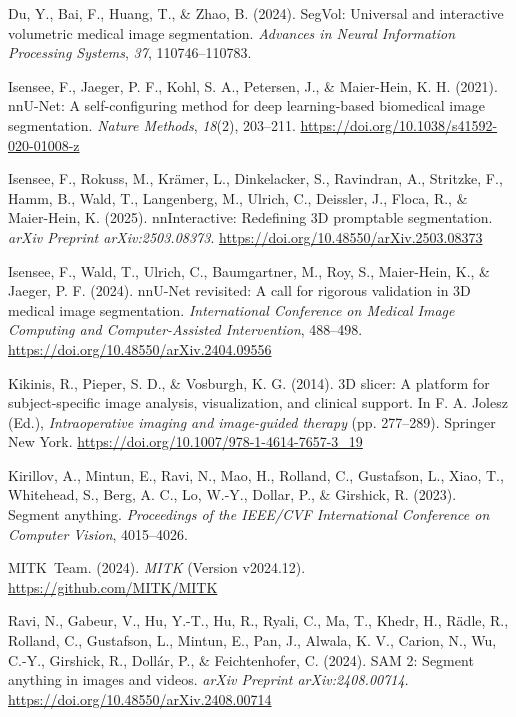 \documentclass[
]{article}
\newlength{\cslhangindent}
\newenvironment{CSLReferences}[2] %
 {\begin{list}{}{%
  \setlength{\itemindent}{0pt}
  \setlength{\leftmargin}{0pt}
  \setlength{\parsep}{0pt}
  \ifodd #1
   \setlength{\leftmargin}{\cslhangindent}
   \setlength{\itemindent}{-1\cslhangindent}
  \fi
  \setlength{\itemsep}{#2\baselineskip}}}
 {\end{list}}
\begin{document}
\label{refs}
\begin{CSLReferences}{1}{0}
Du, Y., Bai, F., Huang, T., \& Zhao, B. (2024). {SegVol}: Universal and
interactive volumetric medical image segmentation. \emph{Advances in
Neural Information Processing Systems}, \emph{37}, 110746--110783.

Isensee, F., Jaeger, P. F., Kohl, S. A., Petersen, J., \& Maier-Hein, K.
H. (2021). {nnU-Net}: A self-configuring method for deep learning-based
biomedical image segmentation. \emph{Nature Methods}, \emph{18}(2),
203--211. \url{https://doi.org/10.1038/s41592-020-01008-z}

Isensee, F., Rokuss, M., Krämer, L., Dinkelacker, S., Ravindran, A.,
Stritzke, F., Hamm, B., Wald, T., Langenberg, M., Ulrich, C., Deissler,
J., Floca, R., \& Maier-Hein, K. (2025). nnInteractive: Redefining 3D
promptable segmentation. \emph{arXiv Preprint arXiv:2503.08373}.
\url{https://doi.org/10.48550/arXiv.2503.08373}

Isensee, F., Wald, T., Ulrich, C., Baumgartner, M., Roy, S., Maier-Hein,
K., \& Jaeger, P. F. (2024). {nnU-Net} revisited: A call for rigorous
validation in {3D} medical image segmentation. \emph{International
Conference on Medical Image Computing and Computer-Assisted
Intervention}, 488--498. \url{https://doi.org/10.48550/arXiv.2404.09556}

Kikinis, R., Pieper, S. D., \& Vosburgh, K. G. (2014). 3D slicer: A
platform for subject-specific image analysis, visualization, and
clinical support. In F. A. Jolesz (Ed.), \emph{Intraoperative imaging
and image-guided therapy} (pp. 277--289). Springer New York.
\url{https://doi.org/10.1007/978-1-4614-7657-3_19}

Kirillov, A., Mintun, E., Ravi, N., Mao, H., Rolland, C., Gustafson, L.,
Xiao, T., Whitehead, S., Berg, A. C., Lo, W.-Y., Dollar, P., \&
Girshick, R. (2023). Segment anything. \emph{Proceedings of the IEEE/CVF
International Conference on Computer Vision}, 4015--4026.

MITK~Team. (2024). \emph{{MITK}} (Version v2024.12).
\url{https://github.com/MITK/MITK}

Ravi, N., Gabeur, V., Hu, Y.-T., Hu, R., Ryali, C., Ma, T., Khedr, H.,
Rädle, R., Rolland, C., Gustafson, L., Mintun, E., Pan, J., Alwala, K.
V., Carion, N., Wu, C.-Y., Girshick, R., Dollár, P., \& Feichtenhofer,
C. (2024). {SAM} 2: Segment anything in images and videos. \emph{arXiv
Preprint arXiv:2408.00714}.
\url{https://doi.org/10.48550/arXiv.2408.00714}


\end{CSLReferences}
\end{document}
